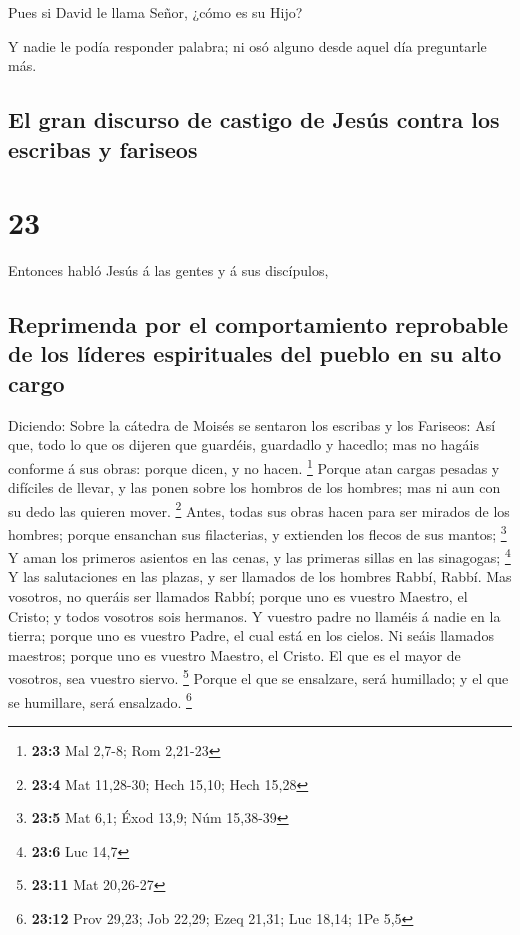  Pues si David le llama Señor, ¿cómo es su Hijo?

 Y nadie le podía responder palabra; ni osó alguno desde
aquel día preguntarle más.

\hypertarget{el-gran-discurso-de-castigo-de-jesuxfas-contra-los-escribas-y-fariseos}{%
\subsection{El gran discurso de castigo de Jesús contra los escribas y
fariseos}\label{el-gran-discurso-de-castigo-de-jesuxfas-contra-los-escribas-y-fariseos}}

\hypertarget{section-22}{%
\section{23}\label{section-22}}

 Entonces habló Jesús á las gentes y á sus discípulos,

\hypertarget{reprimenda-por-el-comportamiento-reprobable-de-los-luxedderes-espirituales-del-pueblo-en-su-alto-cargo}{%
\subsection{Reprimenda por el comportamiento reprobable de los líderes
espirituales del pueblo en su alto
cargo}\label{reprimenda-por-el-comportamiento-reprobable-de-los-luxedderes-espirituales-del-pueblo-en-su-alto-cargo}}

 Diciendo: Sobre la cátedra de Moisés se sentaron los
escribas y los Fariseos:  Así que, todo lo que os dijeren
que guardéis, guardadlo y hacedlo; mas no hagáis conforme á sus obras:
porque dicen, y no hacen. \footnote{\textbf{23:3} Mal 2,7-8; Rom 2,21-23}
 Porque atan cargas pesadas y difíciles de llevar, y las
ponen sobre los hombros de los hombres; mas ni aun con su dedo las
quieren mover. \footnote{\textbf{23:4} Mat 11,28-30; Hech 15,10; Hech
  15,28}  Antes, todas sus obras hacen para ser mirados de
los hombres; porque ensanchan sus filacterias, y extienden los flecos de
sus mantos; \footnote{\textbf{23:5} Mat 6,1; Éxod 13,9; Núm 15,38-39}
 Y aman los primeros asientos en las cenas, y las primeras
sillas en las sinagogas; \footnote{\textbf{23:6} Luc 14,7} 
Y las salutaciones en las plazas, y ser llamados de los hombres Rabbí,
Rabbí.  Mas vosotros, no queráis ser llamados Rabbí; porque
uno es vuestro Maestro, el Cristo; y todos vosotros sois hermanos.
 Y vuestro padre no llaméis á nadie en la tierra; porque uno
es vuestro Padre, el cual está en los cielos.  Ni seáis
llamados maestros; porque uno es vuestro Maestro, el Cristo.
 El que es el mayor de vosotros, sea vuestro siervo.
\footnote{\textbf{23:11} Mat 20,26-27}  Porque el que se
ensalzare, será humillado; y el que se humillare, será ensalzado.
\footnote{\textbf{23:12} Prov 29,23; Job 22,29; Ezeq 21,31; Luc 18,14;
  1Pe 5,5}

